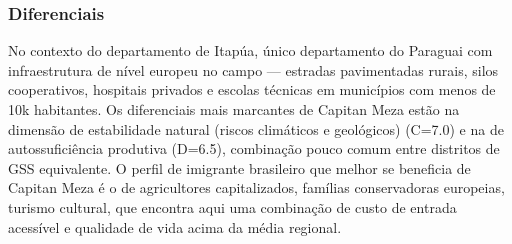 \subsubsection*{Diferenciais}\label{dif-capitan-meza-0704}
No contexto do departamento de Itapúa, único departamento do Paraguai com infraestrutura de nível europeu no campo — estradas pavimentadas rurais, silos cooperativos, hospitais privados e escolas técnicas em municípios com menos de 10k habitantes. Os diferenciais mais marcantes de Capitan Meza estão na dimensão de estabilidade natural (riscos climáticos e geológicos) (C=7.0) e na de autossuficiência produtiva (D=6.5), combinação pouco comum entre distritos de GSS equivalente. O perfil de imigrante brasileiro que melhor se beneficia de Capitan Meza é o de agricultores capitalizados, famílias conservadoras europeias, turismo cultural, que encontra aqui uma combinação de custo de entrada acessível e qualidade de vida acima da média regional.
